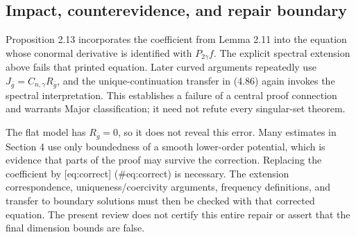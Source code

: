\documentclass[10pt]{article}
\begin{document}
\subsection*{Impact, counterevidence, and repair boundary}
Proposition 2.13 incorporates the coefficient from Lemma 2.11 into the equation whose conormal derivative is identified with \(P_{2\gamma}f\). The explicit spectral extension above fails that printed equation. Later curved arguments repeatedly use \(J_{\bar g}=C_{n,\gamma}R_{\bar g}\), and the unique-continuation transfer in (4.86) again invokes the spectral interpretation. This establishes a failure of a central proof connection and warrants Major classification; it need not refute every singular-set theorem.\par
The flat model has \(R_{\bar g}=0\), so it does not reveal this error. Many estimates in Section 4 use only boundedness of a smooth lower-order potential, which is evidence that parts of the proof may survive the correction. Replacing the coefficient by [eq:correct] (\#eq:correct) is necessary. The extension correspondence, uniqueness/coercivity arguments, frequency definitions, and transfer to boundary solutions must then be checked with that corrected equation. The present review does not certify this entire repair or assert that the final dimension bounds are false.\par
\end{document}
